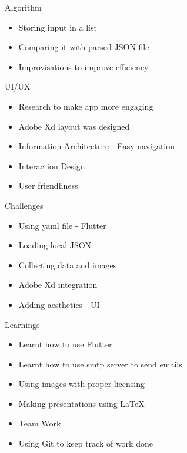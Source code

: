 \documentclass[14pt]{beamer}
\begin{document}
\begin{frame}{Algorithm}
    \begin{itemize}
        \item Storing input in a list
        \item Comparing it with parsed JSON file
        \item Improvisations to improve efficiency 
    \end{itemize}
\end{frame}

\begin{frame}{UI/UX}
    \begin{itemize}
        \item Research to make app more engaging
        \item Adobe Xd layout was designed 
        \item Information Architecture - Easy navigation
        \item Interaction Design
        \item User friendliness
    \end{itemize}
\end{frame}

\begin{frame}{Challenges}
    \begin{itemize}
        \item Using yaml file - Flutter
        \item Loading local JSON
        \item Collecting data and images
        \item Adobe Xd integration
        \item Adding aesthetics - UI
    \end{itemize}
\end{frame}

\begin{frame}{Learnings}
    \begin{itemize}
        \item Learnt how to use Flutter
        \item Learnt how to use smtp server to send emails
        \item Using images with proper licensing
        \item Making presentations using LaTeX
        \item Team Work
        \item Using Git to keep track of work done
    \end{itemize}
\end{frame}
\end{document}
